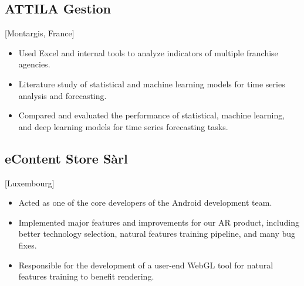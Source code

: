 \documentclass{mycv}
\begin{document}
\subsection{ATTILA Gestion}[Montargis, France]

\begin{positions}
\end{positions}

\begin{itemize}
  \item Used Excel and internal tools to analyze indicators of multiple franchise agencies.
  \item Literature study of statistical and machine learning models for time series analysis and forecasting.
  \item Compared and evaluated the performance of statistical, machine learning, and deep learning models for time series forecasting tasks.
\end{itemize}



\subsection{eContent Store S\`arl}[Luxembourg]
\begin{positions}
\end{positions}

\begin{itemize}
  \item Acted as one of the core developers of the Android development team.
  \item Implemented major features and improvements for our AR product, including better technology selection, natural features training pipeline, and many bug fixes.
  \item Responsible for the development of a user-end WebGL tool for natural features training to benefit rendering.
\end{itemize}
\end{document}
